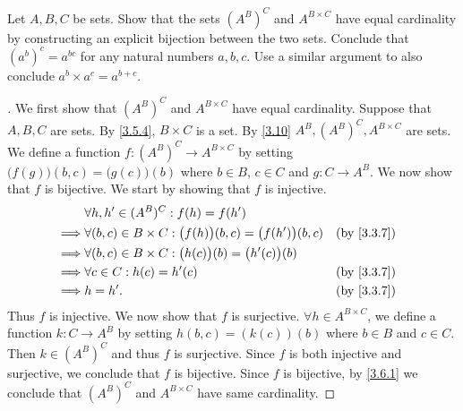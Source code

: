 \begin{ex}\label{ex:3.6.6}
	Let \(A, B, C\) be sets.
	Show that the sets \((A^B)^C\) and \(A^{B \times C}\) have equal cardinality by constructing an explicit bijection between the two sets.
	Conclude that \((a^b)^c = a^{bc}\) for any natural numbers \(a, b, c\).
	Use a similar argument to also conclude \(a^b \times a^c = a^{b+c}\).
\end{ex}

\begin{proof}[]
	We first show that \((A^B)^C\) and \(A^{B \times C}\) have equal cardinality.
	Suppose that \(A, B, C\) are sets.
	By \cref{3.5.4}, \(B \times C\) is a set.
	By \cref{3.10} \(A^B, (A^B)^C, A^{B \times C}\) are sets.
	We define a function \(f : (A^B)^C \to A^{B \times C}\) by setting \(\big(f(g)\big)(b, c) = \big(g(c)\big)(b)\) where \(b \in B\), \(c \in C\) and \(g : C \to A^B\).
	We now show that \(f\) is bijective.
	We start by showing that \(f\) is injective.
	\begin{align*}
		         & \forall h, h' \in (A^B)^C : f(h) = f(h')                                                     \\
		\implies & \forall (b, c) \in B \times C : \big(f(h)\big)(b, c) = \big(f(h')\big)(b, c) &  & \by{3.3.7} \\
		\implies & \forall (b, c) \in B \times C : \big(h(c)\big)(b) = \big(h'(c)\big)(b)                       \\
		\implies & \forall c \in C : h(c) = h'(c)                                               &  & \by{3.3.7} \\
		\implies & h = h'.                                                                      &  & \by{3.3.7}
	\end{align*}
	Thus \(f\) is injective.
	We now show that \(f\) is surjective.
	\(\forall h \in A^{B \times C}\), we define a function \(k : C \to A^B\) by setting \(h(b, c) = (k(c))(b)\) where \(b \in B\) and \(c \in C\).
	Then \(k \in (A^B)^C\) and thus \(f\) is surjective.
	Since \(f\) is both injective and surjective, we conclude that \(f\) is bijective.
	Since \(f\) is bijective, by \cref{3.6.1} we conclude that \((A^B)^C\) and \(A^{B \times C}\) have same cardinality.


\end{proof}
